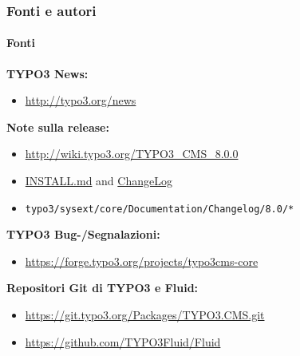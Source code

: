\begin{frame}[fragile]
	\frametitle{Fonti e autori}
	\framesubtitle{Fonti}

	\textbf{TYPO3 News:}
		\begin{itemize}\smaller
			\item \url{http://typo3.org/news}
		\end{itemize}

	\textbf{Note sulla release:}
		\begin{itemize}\smaller
			\item \url{http://wiki.typo3.org/TYPO3_CMS_8.0.0}
			\item \href{https://github.com/TYPO3/TYPO3.CMS/blob/master/INSTALL.md}{INSTALL.md} and \href{https://github.com/TYPO3/TYPO3.CMS/tree/master/typo3/sysext/core/Documentation/Changelog}{ChangeLog}
			\item \texttt{typo3/sysext/core/Documentation/Changelog/8.0/*}
		\end{itemize}

	\textbf{TYPO3 Bug-/Segnalazioni:}
		\begin{itemize}\smaller
			\item \url{https://forge.typo3.org/projects/typo3cms-core}
		\end{itemize}

	\textbf{Repositori Git di TYPO3 e Fluid:}
		\begin{itemize}\smaller
			\item \url{https://git.typo3.org/Packages/TYPO3.CMS.git}
			\item \url{https://github.com/TYPO3Fluid/Fluid}
		\end{itemize}

\end{frame}


